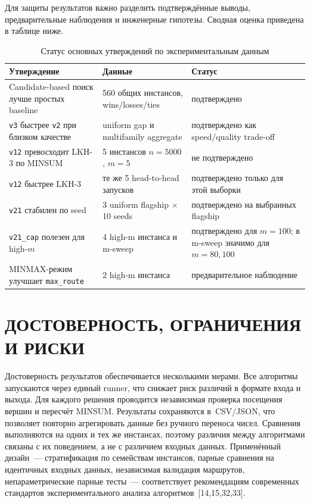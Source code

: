 \documentclass[14pt,a4paper]{extarticle}
\newcommand{\source}[1]{[#1]}
\begin{document}
Для защиты результатов важно разделить подтверждённые выводы, предварительные наблюдения и инженерные гипотезы. Сводная оценка приведена в таблице ниже.

\begin{table}[H]
\centering
\caption{Статус основных утверждений по экспериментальным данным}
\small
\begin{tabular}{p{}p{}p{}}
\toprule
\textbf{Утверждение} & \textbf{Данные} & \textbf{Статус}\\
\midrule
Candidate-based поиск лучше простых baseline & 560 общих инстансов, wins/losses/ties & подтверждено\\
\texttt{v3} быстрее \texttt{v2} при близком качестве & uniform gap и multifamily aggregate & подтверждено как speed/quality trade-off\\
\texttt{v12} превосходит LKH-3 по MINSUM & 5 инстансов $n=5000$, $m=5$ & не подтверждено\\
\texttt{v12} быстрее LKH-3 & те же 5 head-to-head запусков & подтверждено только для этой выборки\\
\texttt{v21} стабилен по seed & 3 uniform flagship $\times$ 10 seeds & подтверждено на выбранных flagship\\
\texttt{v21\_cap} полезен для high-$m$ & 4 high-m инстанса и m-sweep & подтверждено для $m=100$; в m-sweep значимо для $m=80,100$\\
MINMAX-режим улучшает \texttt{max\_route} & 2 high-m инстанса & предварительное наблюдение\\
\bottomrule
\end{tabular}
\normalsize
\end{table}
\section{ДОСТОВЕРНОСТЬ, ОГРАНИЧЕНИЯ И РИСКИ}

Достоверность результатов обеспечивается несколькими мерами. Все алгоритмы запускаются через единый runner, что снижает риск различий в формате входа и выхода. Для каждого решения проводится независимая проверка посещения вершин и пересчёт MINSUM. Результаты сохраняются в~CSV/JSON, что позволяет повторно агрегировать данные без ручного переноса чисел. Сравнения выполняются на одних и тех же инстансах, поэтому различия между алгоритмами связаны с их поведением, а не с различием входных данных. Применённый дизайн~--- стратификация по семействам инстансов, парные сравнения на идентичных входных данных, независимая валидация маршрутов, непараметрические парные тесты~--- соответствует рекомендациям современных стандартов экспериментального анализа алгоритмов~\source{14,15,32,33}.
\end{document}
